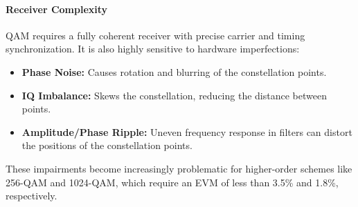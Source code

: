 \paragraph{Receiver Complexity}
QAM requires a fully coherent receiver with precise carrier and timing synchronization. It is also highly sensitive to hardware imperfections:
\begin{itemize}
    \item \textbf{Phase Noise:} Causes rotation and blurring of the constellation points.
    \item \textbf{IQ Imbalance:} Skews the constellation, reducing the distance between points.
    \item \textbf{Amplitude/Phase Ripple:} Uneven frequency response in filters can distort the positions of the constellation points.
\end{itemize}
These impairments become increasingly problematic for higher-order schemes like 256-QAM and 1024-QAM, which require an EVM of less than 3.5\% and 1.8\%, respectively.


